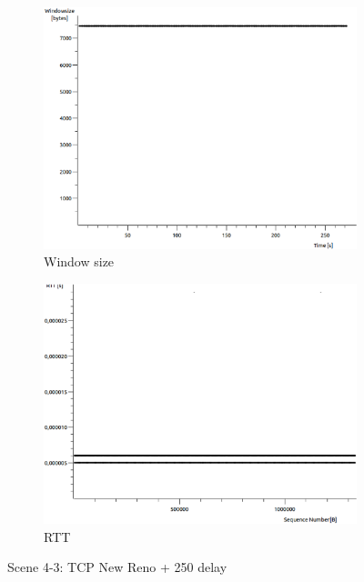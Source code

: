 \documentclass[conference,a4paper]{IEEEtran}
\begin{document}
\begin{figure}
\begin{subfigure}[b]{0.2\textwidth}
  \includegraphics[width=\textwidth]{s4-3_wnd}
  \caption{Window size}
 \end{subfigure}
 \begin{subfigure}[b]{0.2\textwidth}
  \includegraphics[width=\textwidth]{s4-3_rtt}
  \caption{RTT}
 \end{subfigure}
 \caption{Scene 4-3: TCP New Reno + 250 delay}
\end{figure}
\end{document}
